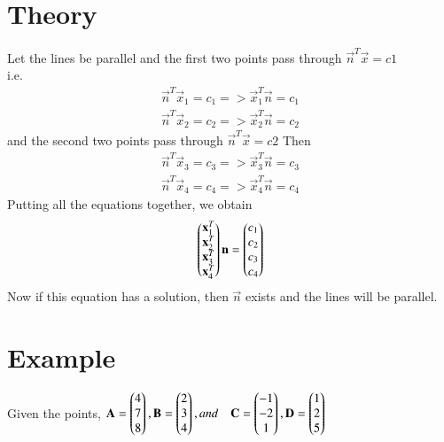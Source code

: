 \documentclass[journal,12pt,twocolumn]{IEEEtran}
\begin{document}
\section{Theory}
Let the lines be parallel and the first two points pass through $\vec{n}^T\vec{x} = c1$\\
i.e.
\begin{align}
	\vec{n}^T\vec{x}_1=c_1 => \vec{x}_1^T\vec{n} = c_1 \\
	\vec{n}^T\vec{x}_2=c_2 => \vec{x}_2^T\vec{n} = c_2
\end{align}
and the second two points pass through $\vec{n}^T\vec{x} = c2$
Then
\begin{align}
	\vec{n}^T\vec{x}_3=c_3 => \vec{x}_3^T\vec{n} = c_3 \\
	\vec{n}^T\vec{x}_4=c_4 => \vec{x}_4^T\vec{n} = c_4
\end{align}
Putting all the equations together, we obtain
\begin{align}
	\begin{pmatrix}\mathbf{x}_1^T\\ \mathbf{x}_2^T\\ \mathbf{x}_3^T\\ \mathbf{x}_4^T\end{pmatrix}\mathbf{n} = \begin{pmatrix}c_1\\c_2\\c_3\\c_4\end{pmatrix}
\end{align}
Now if this equation has a solution, then $\vec{n}$ exists and the lines will be parallel.\\
\vspace{3mm}
\section{Example}
Given the points, $\mathbf{A} = \begin{pmatrix} 4\\7\\	8\end{pmatrix}, 
\mathbf{B} = \begin{pmatrix} 2\\ 3\\ 4\end{pmatrix}, and \quad
\mathbf{C} = \begin{pmatrix} -1\\ -2\\ 1 \end{pmatrix}, 
\mathbf{D} = \begin{pmatrix} 1\\ 2\\ 5\end{pmatrix} $\\
\end{document}
